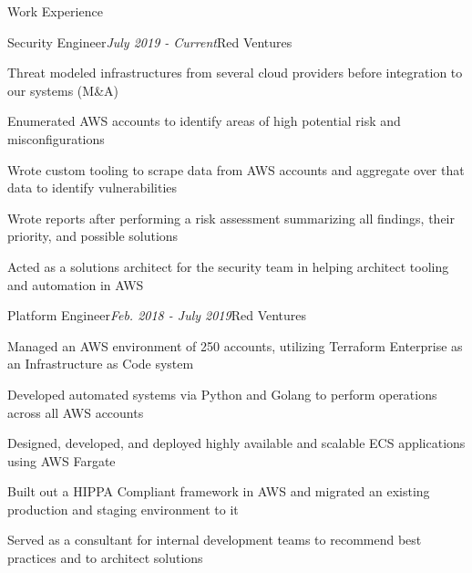 \documentclass{resume} %
\begin{document}
\begin{rSection}{\vspace{-5pt}Work Experience}

  \begin{rSubsection}{Security Engineer}{\em July 2019 - Current}{Red Ventures}{}
  \item {Threat modeled infrastructures from several cloud providers before integration to our systems (M\&A)}
  \item {Enumerated AWS accounts to identify areas of high potential risk and misconfigurations }
  \item {Wrote custom tooling to scrape data from AWS accounts and aggregate over that data to identify vulnerabilities}
  \item {Wrote reports after performing a risk assessment summarizing all findings, their priority, and possible solutions}
  \item {Acted as a solutions architect for the security team in helping architect tooling and automation in AWS}

  \end{rSubsection}



\begin{rSubsection}{Platform Engineer}{\em Feb. 2018 - July 2019}{Red Ventures}{}
\item {Managed an AWS environment of 250 accounts, utilizing Terraform Enterprise as an Infrastructure as Code system}
\item {Developed automated systems via Python and Golang to perform operations across all AWS accounts}
\item {Designed, developed, and deployed highly available and scalable ECS applications using AWS Fargate}
\item {Built out a HIPPA Compliant framework in AWS and migrated an existing production and staging environment to it}
\item {Served as a consultant for internal development teams to recommend best practices and to architect solutions}

\end{rSubsection}




\end{rSection}
\end{document}
